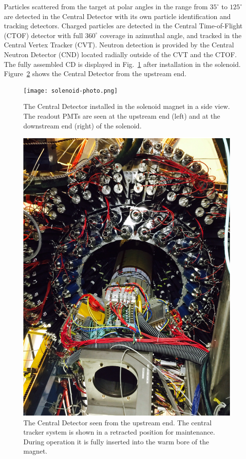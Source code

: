 \documentclass[final,3p,twocolumn]{elsarticle}
\begin{document}
Particles scattered from the target at polar angles in the range from $35^\circ$  to $125^\circ$ are detected in the
Central Detector with its own particle identification and tracking detectors. Charged particles are detected in the
Central Time-of-Flight (CTOF) detector with full $360^\circ$ coverage in azimuthal angle, and tracked in the Central
Vertex Tracker (CVT). Neutron detection is provided by the Central Neutron Detector (CND) located radially outside
of the CVT and the CTOF.  The fully assembled CD is displayed in Fig.~\ref{CDinSol} after installation in the solenoid.
Figure~\ref{CDback} shows the Central Detector from the upstream end.

\begin{figure}[htbp!]
\centerline{\texttt{[image: solenoid-photo.png]}}
\caption{The Central Detector installed in the solenoid magnet in a side view. The readout PMTs are seen at the
  upstream end (left) and at the downstream end (right) of the solenoid.}
\label{CDinSol}
\end{figure}

\begin{figure}[htbp!]
\centerline{\includegraphics[width=1.0\columnwidth]{CLAS12-CD.png}}
\caption{The Central Detector seen from the upstream end. The central tracker system is shown in a retracted
  position for maintenance. During operation it is fully inserted into the warm bore of the magnet.}
\label{CDback}
\end{figure}
\end{document}
